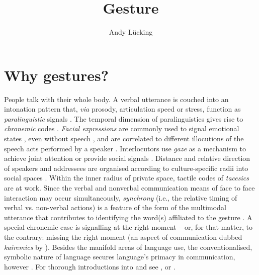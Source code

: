 \documentclass[output=paper]{langsci/langscibook}
\author{Andy Lücking\affiliation{Universit\'{e} de Paris, Goethe-Universität Frankfurt}}
\title{Gesture}
\begin{document}
\label{chap-gesture}

\avmoptions{}

\section{Why gestures?} 
\label{sec:why-gestures}

People talk with their whole body. 
%
A verbal utterance is couched into an intonation pattern that, \textit{via} prosody, articulation speed or stress, function as \emph{paralinguistic}  signals \citep[e.g.][]{Birdwhistell:1970}. 
%
The temporal dimension of paralinguistics gives rise to \emph{chronemic} codes  \citep{Poyatos:1975,Bruneau:1980}. \emph{Facial expressions}  are commonly used to signal emotional states  \citep{Ekman:Friesen:1978}, even without speech \citep{Argyle:1975}, and are correlated to different illocutions of the speech acts performed by a speaker \citep{Domaneschi:Passarelli:Chiorri:2017}.
%
Interlocutors use \emph{gaze}  as a mechanism to achieve joint attention \citep{Argyle:Cook:1976} or provide social signals \citep{Kendon:1967}. 
%
Distance and relative direction of speakers and addressees are organised according to culture-specific radii into social spaces  \citep[\emph{proxemics},][]{Hall:1968}. 
%
Within the inner radius of private space, tactile codes of \emph{tacesics}  \citep{Kauffman:1971} are at work. 
%
Since the verbal and nonverbal communication means of face to face interaction  may occur simultaneously, \emph{synchrony}  (i.e., the relative timing of verbal vs. non-verbal actions) is a feature of the form of the multimodal utterance that contributes to identifying the word(s) affiliated to the gesture \citep{Wiltshire:2007}. 
%
A special chronemic case is signalling at the right moment -- or, for that matter, to the contrary: missing the right moment (an aspect of communication dubbed \emph{kairemics}  by \citet[]{Luecking:Pfeiffer:2012}).
%
Besides the manifold areas of language use, the conventionalised, symbolic nature of language secures language's primacy in communication, however \citep{de:Ruiter:2004}.
%
For thorough introductions into  and  see \citet{Noeth:1990}, \citet{Posner:Robering:Sebeok:1997:2004} or \citet{Mueller:Cienki:Fricke:Ladewig:McNeill:Tessendorf:2013:2014}.
\end{document}
